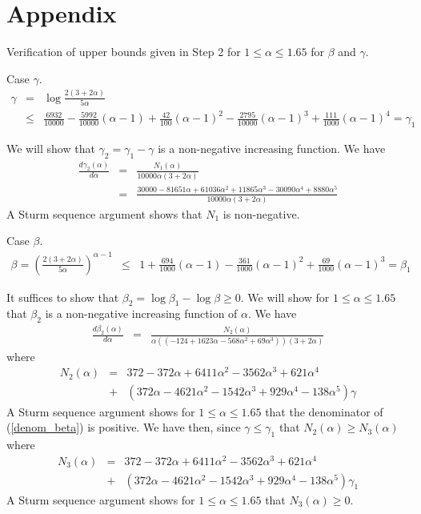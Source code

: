 \documentclass[12pt]{article}
\begin{document}
\section{Appendix}

Verification of upper bounds given in Step 2 for $1 \le \alpha \le 1.65$ for $\beta$ and $\gamma$.

Case $\gamma$.
\begin{eqnarray*} 
\gamma &=& \log \frac{2(3+2\alpha)}{5\alpha} \\ &\le& \frac{6932}{10000}-\frac{5992}{10000}(\alpha-1)+\frac{42}{100}(\alpha-1)^2-\frac{2795}{10000}(\alpha-1)^3 + \frac{111}{1000}(\alpha-1)^4 = \gamma_1
\end{eqnarray*}

We will show that $\gamma_2 = \gamma_1 - \gamma$ is a non-negative increasing function.  We have
\begin{eqnarray*}
\frac{d \gamma_2(\alpha)}{d\alpha} &=& \frac{N_1(\alpha)}{10000\alpha(3+2\alpha)} \\ 
      &=& \frac{30000-81651\alpha+61036\alpha^2+11865\alpha^3-30090\alpha^4+8880\alpha^5}{10000\alpha(3+2\alpha)}
\end{eqnarray*}
A Sturm sequence argument shows that $N_1$ is non-negative.

\vspace{0.2in}

Case $\beta$.  
\begin{eqnarray*} 
\beta = \left( \frac{2(3+2\alpha)}{5\alpha} \right)^{\alpha-1} &\le&  1+\frac{694}{1000}(\alpha-1)-\frac{361}{1000}(\alpha-1)^2+\frac{69}{1000}(\alpha-1)^3 = \beta_1
\end{eqnarray*}

It suffices to show that $\beta_2 = \log \beta_1 - \log \beta \ge 0$.  We will show for $1 \le \alpha \le 1.65$ 
that $\beta_2$ is a non-negative increasing function of $\alpha$.  
We have 
\begin{eqnarray} \label{denom_beta}
\frac{d \beta_2(\alpha)}{d\alpha} &=& \frac{N_2(\alpha)}{\alpha((-124+1623\alpha-568\alpha^2+69\alpha^3))(3+2\alpha)}
\end{eqnarray}
where
\begin{eqnarray*} 
N_2(\alpha) &=& 372-372\alpha+6411\alpha^2-3562\alpha^3+621\alpha^4 \\
            &+& (372\alpha-4621\alpha^2-1542\alpha^3+929\alpha^4-138\alpha^5)\gamma
\end{eqnarray*}
A Sturm sequence argument shows for $1 \le \alpha \le 1.65$ that the denominator of (\ref{denom_beta}) is positive.  
We have then, since $\gamma \le \gamma_1$ that $N_2(\alpha) \ge N_3(\alpha)$ where
\begin{eqnarray*} 
N_3(\alpha) &=& 372-372\alpha+6411\alpha^2-3562\alpha^3+621\alpha^4 \\
            &+& (372\alpha-4621\alpha^2-1542\alpha^3+929\alpha^4-138\alpha^5)\gamma_1
\end{eqnarray*}
A Sturm sequence argument shows for $1 \le \alpha \le 1.65$ that $N_3(\alpha) \ge 0$.
\end{document}

